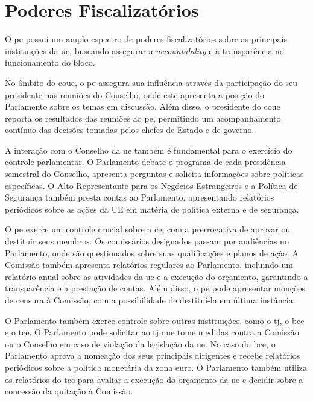 \section{Poderes Fiscalizatórios}

O \acrshort{pe} possui um amplo espectro de poderes fiscalizatórios sobre as principais instituições da \acrshort{ue}, buscando assegurar a \textit{accountability} e a transparência no funcionamento do bloco.

No âmbito do \acrshort{coue}, o \acrshort{pe} assegura sua influência através da participação do seu presidente nas reuniões do Conselho, onde este apresenta a posição do Parlamento sobre os temas em discussão. Além disso, o presidente do \acrshort{coue} reporta os resultados das reuniões ao \acrshort{pe}, permitindo um acompanhamento contínuo das decisões tomadas pelos chefes de Estado e de governo.

A interação com o Conselho da \acrshort{ue} também é fundamental para o exercício do controle parlamentar. O Parlamento debate o programa de cada presidência semestral do Conselho, apresenta perguntas e solicita informações sobre políticas específicas. O Alto Representante para os Negócios Estrangeiros e a Política de Segurança também presta contas ao Parlamento, apresentando relatórios periódicos sobre as ações da UE em matéria de política externa e de segurança.
 
O \acrshort{pe} exerce um controle crucial sobre a \acrshort{ce}, com a prerrogativa de aprovar ou destituir seus membros. Os comissários designados passam por audiências no Parlamento, onde são questionados sobre suas qualificações e planos de ação. A Comissão também apresenta relatórios regulares ao Parlamento, incluindo um relatório anual sobre as atividades da \acrshort{ue} e a execução do orçamento, garantindo a transparência e a prestação de contas. Além disso, o \acrshort{pe} pode apresentar monções de censura à Comissão, com a possibilidade de destituí-la em última instância. 

O Parlamento também exerce controle sobre outras instituições, como o \acrfull{tj}, o \acrfull{bce} e o \acrfull{tce}. O Parlamento pode solicitar ao \acrshort{tj} que tome medidas contra a Comissão ou o Conselho em caso de violação da legislação da \acrshort{ue}. No caso do \acrshort{bce}, o Parlamento aprova a nomeação dos seus principais dirigentes e recebe relatórios periódicos sobre a política monetária da zona euro. O Parlamento também utiliza os relatórios do \acrshort{tce} para avaliar a execução do orçamento da \acrshort{ue} e decidir sobre a concessão da quitação à Comissão.

